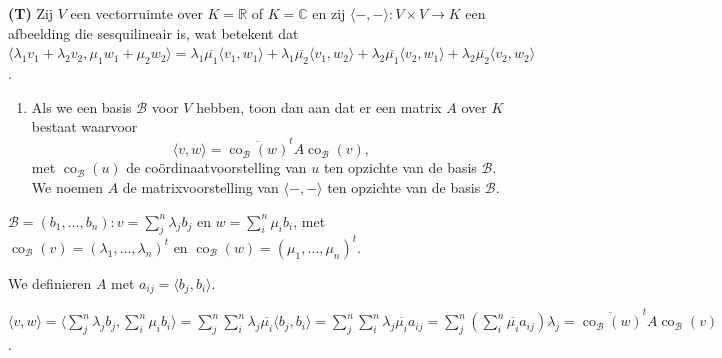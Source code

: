 \begin{oefening}[4.2.4] \textbf{(T)}
    Zij $V$ een vectorruimte over $K = \mathbb{R}$ of $K = \mathbb{C}$ en zij $\langle -, - \rangle \colon V \times V \to K$ een afbeelding die sesquilineair is, wat betekent dat $\langle \lambda_1 v_1 + \lambda_2 v_2, \mu_1 w_1 + \mu_2 w_2 \rangle = \lambda_1 \overline{\mu_1} \langle v_1, w_1 \rangle + \lambda_1 \overline{\mu_2} \langle v_1, w_2 \rangle + \lambda_2 \overline{\mu_1} \langle v_2, w_1 \rangle + \lambda_2 \overline{\mu_2} \langle v_2, w_2 \rangle$.
    \begin{enumerate}
        \item[(a)] Als we een basis $\mathcal{B}$ voor $V$ hebben, toon dan aan dat er een matrix $A$ over $K$ bestaat waarvoor
        \[ \langle v, w \rangle = \overline{\operatorname{co}_{\mathcal{B}}(w)}^t A \operatorname{co}_{\mathcal{B}}(v), \]
        met $\operatorname{co}_{\mathcal{B}}(u)$ de coördinaatvoorstelling van $u$ ten opzichte van de basis $\mathcal{B}$. We noemen $A$ de matrixvoorstelling van $\langle -, - \rangle$ ten opzichte van de basis $\mathcal{B}$.
    \end{enumerate}
    \(\mathcal{B} = (b_1, \dots, b_n) : v = \sum_{j}^{n}{\lambda_j b_j} \text{ en } w = \sum_{i}^{n}{\mu_i b_i}\),
    met \(\operatorname{co}_{\mathcal{B}}(v)= (\lambda_1,\dots,\lambda_n)^t\text{ en }\operatorname{co}_{\mathcal{B}}(w)= (\mu_1,\dots,\mu_n)^t\).
    
    We definieren \(A\) met \(a_{ij} = \langle b_j,b_i \rangle\).

    \(
    \langle v,w \rangle 
    = \langle \sum_{j}^{n}{\lambda_j b_j},\sum_{i}^{n}{\mu_i b_i} \rangle 
    = \sum_{j}^{n}\sum_{i}^{n} \lambda_j \overline{\mu_i} \langle b_j,b_i \rangle
    = \sum_{j}^{n}\sum_{i}^{n} \lambda_j \overline{\mu_i} a_{ij}
    = \sum_{j}^{n}\left(\sum_{i}^{n} \overline{\mu_i} a_{ij}\right)\lambda_j 
    = \overline{\operatorname{co}_{\mathcal{B}}(w)}^t A \operatorname{co}_{\mathcal{B}}(v)
    \).


\end{oefening}
